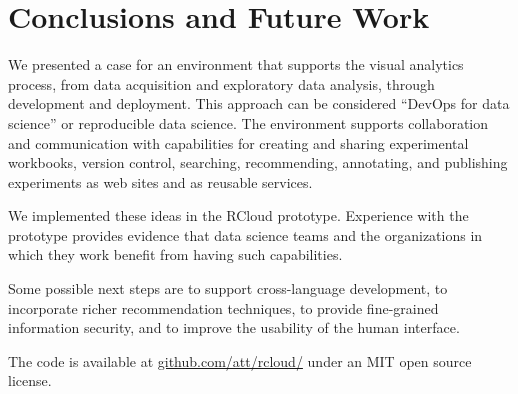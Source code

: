 \section{Conclusions and Future Work}

We presented a case for an environment that supports the visual
analytics process, from data acquisition and exploratory
data analysis, through development and deployment.
This approach can be considered ``DevOps for data science''
or reproducible data science.
The environment supports collaboration and communication
with capabilities for creating and sharing experimental workbooks,
version control, searching, recommending, annotating, and publishing
experiments as web sites and as reusable services. 

We implemented these ideas in the RCloud prototype.
Experience with the prototype provides evidence that data
science teams and the organizations in which they work
benefit from having such capabilities.

Some possible next steps are to support cross-language development,
to incorporate richer recommendation techniques, to provide fine-grained
information security, and to improve the usability of the human interface.

The code is available 
at \url{github.com/att/rcloud/}
under an MIT open source license.
